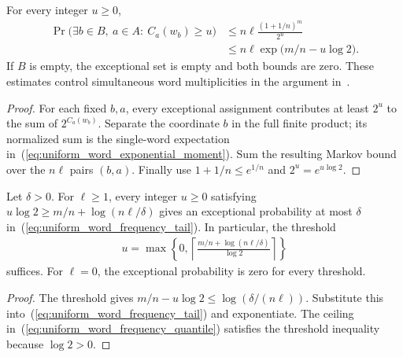\begin{theorem}
    \label{thm:uniform_word_frequency_tail}
    \leanok
    For every integer $u\ge0$,
    \begin{align}
        \Pr\bigl(\exists b\in B,\ a\in A:\ C_a(w_b)\ge u\bigr)
         & \le n\ell\frac{(1+1/n)^m}{2^u}       \\
         & \le n\ell\exp\bigl(m/n-u\log2\bigr).
        \label{eq:uniform_word_frequency_tail}
    \end{align}
    If $B$ is empty, the exceptional set is empty and both bounds are zero.
    These estimates control simultaneous word multiplicities in the argument
    in~\cite[Section~2.3.1, Corollary~2.14]{Landau2013PolynomialTime}.
\end{theorem}
\begin{proof}\leanok
    For each fixed $b,a$, every exceptional assignment contributes at least
    $2^u$ to the sum of $2^{C_a(w_b)}$. Separate the coordinate $b$ in the
    full finite product; its normalized sum is the single-word expectation
    in~(\ref{eq:uniform_word_exponential_moment}). Sum the resulting Markov
    bound over the $n\ell$ pairs $(b,a)$. Finally use $1+1/n\le e^{1/n}$
    and $2^u=e^{u\log2}$.
\end{proof}

\begin{theorem}
    \label{thm:uniform_word_frequency_quantile}
    \leanok
    Let $\delta>0$. For $\ell\ge1$, every integer $u\ge0$ satisfying
    $u\log2\ge m/n+\log(n\ell/\delta)$ gives an exceptional probability
    at most $\delta$ in~(\ref{eq:uniform_word_frequency_tail}). In particular,
    the threshold
    \begin{align}
        u=\max\left\{0,\left\lceil\frac{m/n+\log(n\ell/\delta)}{\log2}\right\rceil\right\}
        \label{eq:uniform_word_frequency_quantile}
    \end{align}
    suffices.
    For $\ell=0$, the exceptional probability is zero for every threshold.
\end{theorem}
\begin{proof}\leanok
    The threshold gives $m/n-u\log2\le\log(\delta/(n\ell))$.
    Substitute this into~(\ref{eq:uniform_word_frequency_tail}) and exponentiate.
    The ceiling in~(\ref{eq:uniform_word_frequency_quantile}) satisfies the
    threshold inequality because $\log2>0$.
\end{proof}
